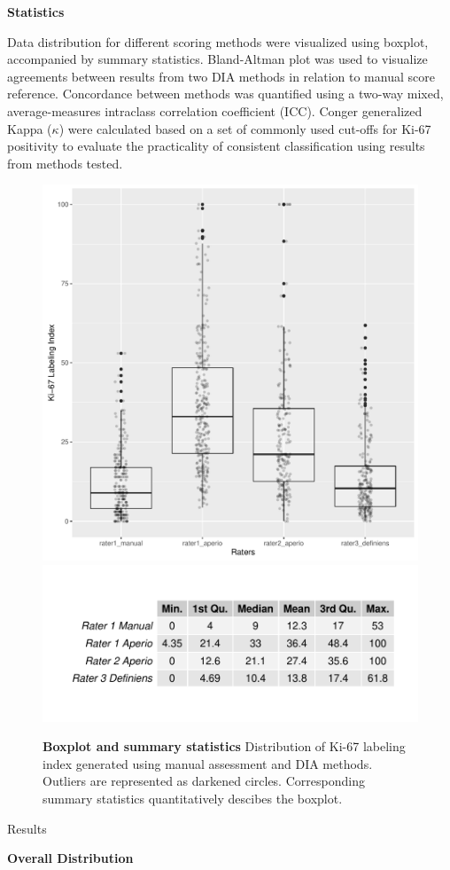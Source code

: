 \documentclass[final]{beamer}
\newlength{\onecolwid}
\begin{document}
\begin{frame}[t]
\begin{columns}[t]
\begin{column}{\onecolwid}
\begin{block}{}

{\bf Statistics}
\newline

Data distribution for different scoring methods were visualized using boxplot, accompanied by summary statistics. Bland-Altman plot was used to visualize agreements between results from two DIA methods in relation to manual score reference. Concordance between methods was quantified using a two-way mixed, average-measures intraclass correlation coefficient (ICC). Conger generalized Kappa ($\kappa$) were calculated based on a set of commonly used cut-offs for Ki-67 positivity to evaluate the practicality of consistent classification using results from methods tested.


\begin{figure}
\includegraphics[width = 0.4\linewidth]{boxplot}
\includegraphics[width = 0.6\linewidth]{boxStat}

\centering
\caption{
{\bf Boxplot and summary statistics}
Distribution of Ki-67 labeling index generated using manual assessment and DIA methods. Outliers are represented as darkened circles. Corresponding summary statistics quantitatively descibes the boxplot.
}
\label{boxplot}
\end{figure}
\end{block}


\begin{block}{Results}
\newline

{\bf Overall Distribution}
\newline


\end{block}
\end{column}
\end{columns}
\end{frame}
\end{document}
